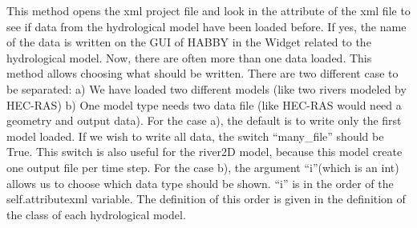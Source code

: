 \documentclass[letterpaper,10pt,english]{sphinxmanual}
\begin{document}
\begin{fulllineitems}
\begin{fulllineitems}

This method opens the xml project file and look in the attribute of the xml file to see if data from the
hydrological model have been loaded before. If yes, the name of the data is written on the GUI of HABBY in the
Widget related to the hydrological model. Now, there are often more than one data loaded. This method allows
choosing what should be written. There are two different case to be separated: a) We have loaded two different
models (like two rivers modeled by HEC-RAS) b) One model type needs two data file (like HEC-RAS would need a
geometry and output data). For the case a), the default is to write only the first model loaded. If we wish to
write all data, the switch “many\_file” should be True. This switch is also useful for the river2D model, because
this model create one output file per time step. For the case b), the argument “i”(which is an int) allows us to
choose which data type should be shown. “i” is in the order of the self.attributexml variable. The definition of
this order is given in the definition of the class of each hydrological model.

\end{fulllineitems}


\end{fulllineitems}

\end{document}
